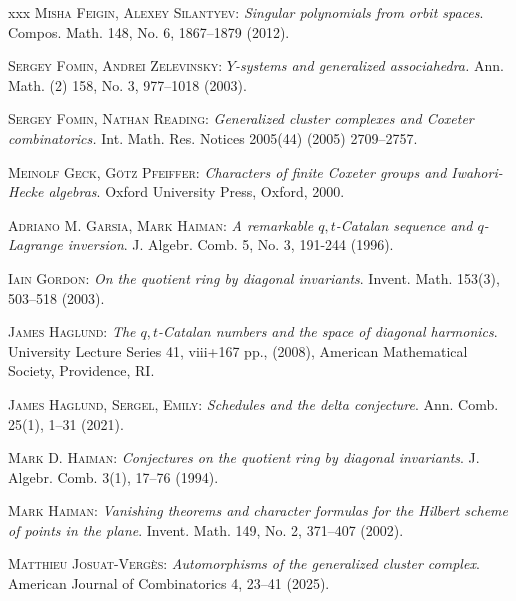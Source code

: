 \documentclass[11pt]{article}
\theoremstyle{definition}
\begin{document}
\begin{thebibliography}{xxx}
    \textsc{Misha Feigin, Alexey Silantyev}:
    {\it Singular polynomials from orbit spaces}.
    Compos. Math. 148, No. 6, 1867--1879 (2012).

    \textsc{Sergey Fomin, Andrei Zelevinsky}:
    {\it $Y$-systems and generalized associahedra.}
    Ann. Math. (2) 158, No. 3, 977--1018 (2003).

    \textsc{Sergey Fomin, Nathan Reading}:
    {\it Generalized cluster complexes and Coxeter combinatorics.}
    Int. Math. Res. Notices 2005(44) (2005) 2709--2757.

    \textsc{Meinolf Geck, Götz Pfeiffer}:
    {\it Characters of finite Coxeter groups and Iwahori-Hecke algebras}.
    Oxford University Press, Oxford, 2000.

    \textsc{Adriano M. Garsia, Mark Haiman}:
    {\it A remarkable $q,t$-Catalan sequence and $q$-Lagrange inversion}.
    J. Algebr. Comb. 5, No. 3, 191-244 (1996).


    
    \textsc{Iain Gordon}:
    {\it On the quotient ring by diagonal invariants}.
    Invent. Math. 153(3), 503--518 (2003).

    \textsc{James Haglund}:
    {\it The $q,t$-Catalan numbers and the space of diagonal harmonics}.
    University Lecture Series 41, viii+167 pp., (2008), American Mathematical Society, Providence, RI.

    \textsc{James Haglund, Sergel, Emily}:
    {\it Schedules and the delta conjecture}.
    Ann. Comb. 25(1), 1--31 (2021).

    \textsc{Mark D. Haiman}:
    {\it Conjectures on the quotient ring by diagonal invariants}.
    J. Algebr. Comb. 3(1), 17--76  (1994).

    \textsc{Mark Haiman}:
    {\it Vanishing theorems and character formulas for the Hilbert scheme of points in the plane}.
    Invent. Math. 149, No. 2, 371--407 (2002).

    \textsc{Matthieu Josuat-Vergès}:
    {\it Automorphisms of the generalized cluster complex}.
    American Journal of Combinatorics 4, 23--41  (2025).


\end{thebibliography}
\end{document}
